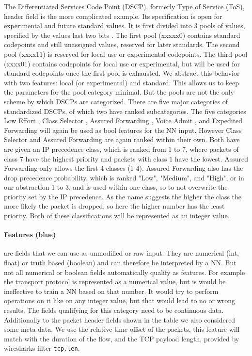 \documentclass[
	ngerman,
	ruledheaders=section,%
	class=report,%
	thesis={type=bachelor},%
	accentcolor=9c,%
	custommargins=true,%
	marginpar=false,%
	parskip=half-,%
	fontsize=11pt,%
]{tudapub}
\let\code\texttt
\begin{document}
The Differentiated Services Code Point (DSCP), formerly Type of Service (ToS), header field is the more complicated example.
Its specification is open for experimental and future standard values.
It is first divided into 3 pools of values, specified by the values last two bits \cite{DifferentiatedServicesField}.
The first pool (xxxxx0) contains standard codepoints and still unassigned values, reserved for later standards.
The second pool (xxxx11) is reserved for local use or experimental codepoints.
The third pool (xxxx01) contains codepoints for local use or experimental, but will be used for standard codepoints once the first pool is exhausted.
We abstract this behavior with two features: local (or experimental) and standard.
This allows us to keep the parameters for the pool category minimal.
But the pools are not the only scheme by which DSCPs are categorized.
There are five major categories of standardized DSCPs, of which two have ranked subcategories.
The five categories Low Effort \cite{blessLowerEffortPerHopBehavior}, Class Selector \cite{nicholsDefinitionDifferentiatedServices}, Assured Forwarding \cite{wroclawskiAssuredForwardingPHB}, Voice Admit \cite{bakerDifferentiatedServicesCode}, and Expedited Forwarding \cite{firoiuExpeditedForwardingPHB} will again be used as bool features for the NN input.
However Class Selector and Assured Forwarding are again ranked within their own.
Both have are given an IP precedence class, which is ranked from 1 to 7, where packets of class 7 have the highest priority and packets with class 1 have the lowest.
Assured Forwarding only allows the first 4 classes (1-4).
Assured Forwarding also has the drop precedence probability, which is ranked "Low", "Medium", and "High", or in our abstraction 1 to 3, and is used within one class, so to not overwrite the priority set by the IP precedence.
As the name suggests the higher the class the more likely the packet is dropped, so here the higher number has the least priority.
Both of these classifications will be represented as an integer value.

\paragraph{\colorbox{feature}{\textbf{Features} (blue)}} are fields that we can use as unmodified or raw input.
They are numerical (int, float) or truth based (boolean) and can therefore be interpreted by a NN.
But not all numerical or boolean fields automatically qualify as features.
For example the transport protocol is represented as a numerical value, but is would be ineffective to train a NN based on that number.
It would try to perform operations on it like on any integer value, but that would lead to no or wrong results.
The fields qualifying for this category need to be continuous data.
Additionally to the packet header fields shown in the table we also considered some meta data.
We use the relative time offset of the packets, this feature will match with the duration of the flow,
and the TCP payload length, provided by wiresharks filter \code{tcp.len}.
\end{document}
